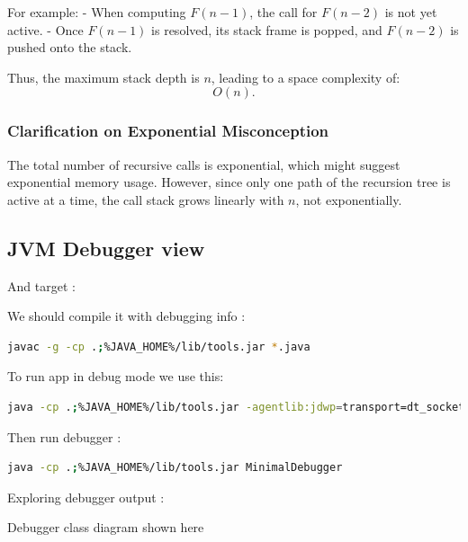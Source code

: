 \documentclass{article}
\begin{document}
For example:
- When computing \( F(n-1) \), the call for \( F(n-2) \) is not yet active.
- Once \( F(n-1) \) is resolved, its stack frame is popped, and \( F(n-2) \) is pushed onto the stack.

Thus, the maximum stack depth is \( n \), leading to a space complexity of:
\[
O(n).
\]

\subsubsection{Clarification on Exponential Misconception}
The total number of recursive calls is exponential, which might suggest exponential memory usage. However, since only one path of the recursion tree is active at a time, the call stack grows linearly with \( n \), not exponentially.

\subsection{JVM Debugger view}

And target : 

We should compile it with debugging info : 
\begin{lstlisting}[language=bash]
	javac -g -cp .;%JAVA_HOME%/lib/tools.jar *.java
\end{lstlisting}
To run app in debug mode we use this: 
\begin{lstlisting}[language=bash]
	java -cp .;%JAVA_HOME%/lib/tools.jar -agentlib:jdwp=transport=dt_socket,server=y,suspend=y,address=5005 FibonacciTarget
\end{lstlisting}
Then run debugger : 
\begin{lstlisting}[language=bash]
	java -cp .;%JAVA_HOME%/lib/tools.jar MinimalDebugger
\end{lstlisting}

Exploring debugger output : 


Debugger class diagram shown here
\end{document}
